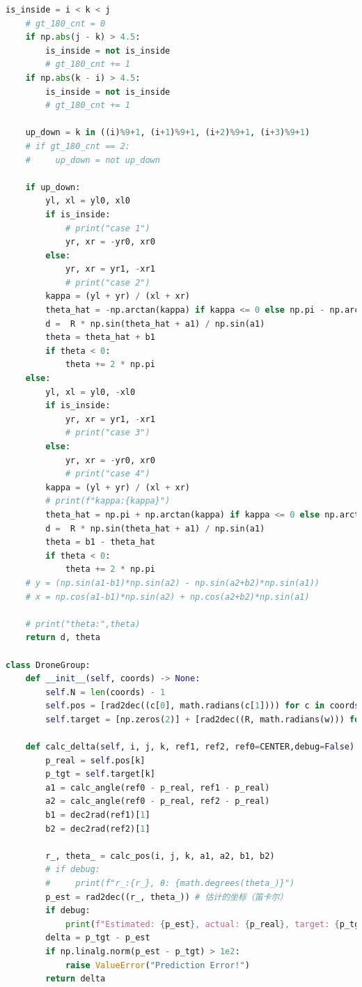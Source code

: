 \documentclass[withoutpreface,bwprint]{cumcmthesis} %
\begin{document}
\begin{appendices}
\begin{lstlisting}[language=python]
    is_inside = i < k < j
    # gt_180_cnt = 0
    if np.abs(j - k) > 4.5:
        is_inside = not is_inside
        # gt_180_cnt += 1
    if np.abs(k - i) > 4.5:
        is_inside = not is_inside
        # gt_180_cnt += 1
    
    up_down = k in ((i)%9+1, (i+1)%9+1, (i+2)%9+1, (i+3)%9+1)
    # if gt_180_cnt == 2:
    #     up_down = not up_down
    
    if up_down:
        yl, xl = yl0, xl0
        if is_inside:
            # print("case 1")
            yr, xr = -yr0, xr0
        else:
            yr, xr = yr1, -xr1
            # print("case 2")
        kappa = (yl + yr) / (xl + xr)
        theta_hat = -np.arctan(kappa) if kappa <= 0 else np.pi - np.arctan(kappa)
        d =  R * np.sin(theta_hat + a1) / np.sin(a1)
        theta = theta_hat + b1
        if theta < 0:
            theta += 2 * np.pi
    else:
        yl, xl = yl0, -xl0
        if is_inside:
            yr, xr = yr1, -xr1
            # print("case 3")
        else:
            yr, xr = -yr0, xr0
            # print("case 4")
        kappa = (yl + yr) / (xl + xr)
        # print(f"kappa:{kappa}")
        theta_hat = np.pi + np.arctan(kappa) if kappa <= 0 else np.arctan(kappa)
        d =  R * np.sin(theta_hat + a1) / np.sin(a1)
        theta = b1 - theta_hat
        if theta < 0:
            theta += 2 * np.pi
    # y = (np.sin(a1-b1)*np.sin(a2) - np.sin(a2+b2)*np.sin(a1))
    # x = np.cos(a1-b1)*np.sin(a2) + np.cos(a2+b2)*np.sin(a1)
    
    # print("theta:",theta)
    return d, theta
    
class DroneGroup:
    def __init__(self, coords) -> None:
        self.N = len(coords) - 1
        self.pos = [rad2dec((c[0], math.radians(c[1]))) for c in coords] # 极坐标
        self.target = [np.zeros(2)] + [rad2dec((R, math.radians(w))) for w in range(0, 360, 360//self.N)]
    
    def calc_delta(self, i, j, k, ref1, ref2, ref0=CENTER,debug=False):
        p_real = self.pos[k]
        p_tgt = self.target[k]
        a1 = calc_angle(ref0 - p_real, ref1 - p_real)
        a2 = calc_angle(ref0 - p_real, ref2 - p_real)
        b1 = dec2rad(ref1)[1]
        b2 = dec2rad(ref2)[1]
        
        r_, theta_ = calc_pos(i, j, k, a1, a2, b1, b2)
        # if debug:
        #     print(f"r_:{r_}, θ: {math.degrees(theta_)}")
        p_est = rad2dec((r_, theta_)) # 估计的坐标（笛卡尔）
        if debug:
            print(f"Estimated: {p_est}, actual: {p_real}, target: {p_tgt}")
        delta = p_tgt - p_est
        if np.linalg.norm(p_est - p_tgt) > 1e2:
            raise ValueError("Prediction Error!")
        return delta
    

\end{lstlisting}
\end{appendices}
\end{document}
